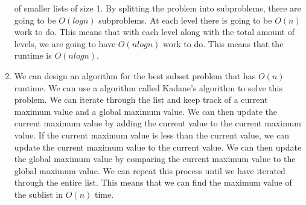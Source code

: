 \documentclass[12pt,letterpaper]{article}
\begin{document}
\begin{enumerate}
    of smaller lists of size 1. By splitting the problem into subproblems, there are going to be $O(log n)$ subproblems. 
    At each level there is going to be $O(n)$ work to do. This means that with each level along with the total amount of levels,
    we are going to have $O(n log n)$ work to do. This means that the runtime is $O(n log n)$.
    \item We can design an algorithm for the best subset problem that has $O(n)$ runtime. We can use a algorithm called
    Kadane's algorithm to solve this problem. We can iterate through the list and keep track of a current maximum value and a global maximum value.
    We can then update the current maximum value by adding the current value to the current maximum value. If the current maximum value is less than the current value,
    we can update the current maximum value to the current value. We can then update the global maximum value by comparing the current maximum value to the global maximum value.
    We can repeat this process until we have iterated through the entire list. This means that we can find the maximum value of the sublist in $O(n)$ time.



\end{enumerate}
\end{document}
